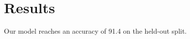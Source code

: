\documentclass{article}
\begin{document}
\section{Results}

Our model reaches an accuracy of 91.4 on the held-out split.
\end{document}
